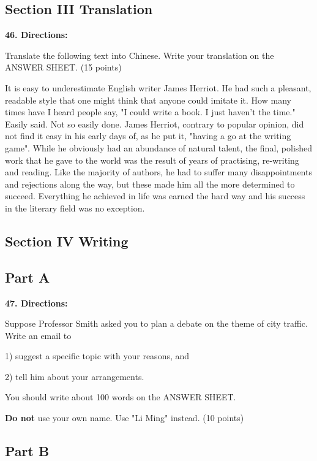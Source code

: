 \documentclass[UTF8,11pt]{ctexart}
\begin{document}
\subsection*{\textbf{Section III Translation}}


\textbf{46. Directions:}


Translate the following text into Chinese. Write your translation on the ANSWER SHEET. (15 points)


It is easy to underestimate English writer James Herriot. He had such a pleasant, readable style that one might think that anyone could imitate it. How many times have I heard people say, "I could write a book. I just haven't the time." Easily said. Not so easily done. James Herriot, contrary to popular opinion, did not find it easy in his early days of, as he put it, "having a go at the writing game". While he obviously had an abundance of natural talent, the final, polished work that he gave to the world was the result of years of practising, re-writing and reading. Like the majority of authors, he had to suffer many disappointments and rejections along the way, but these made him all the more determined to succeed. Everything he achieved in life was earned the hard way and his success in the literary field was no exception.


\subsection*{\textbf{Section IV Writing}}


\subsection*{\textbf{Part A}}


\textbf{47. Directions:}


Suppose Professor Smith asked you to plan a debate on the theme of city traffic. Write an email to


1) suggest a specific topic with your reasons, and


2) tell him about your arrangements.


You should write about 100 words on the ANSWER SHEET.


\textbf{Do not} use your own name. Use "Li Ming" instead. (10 points)


\subsection*{\textbf{Part B}}
\end{document}
